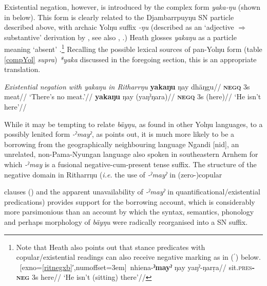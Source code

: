 {Existential negation, however, is introduced by the complex form \textit{yaka-ŋu} (shown in \nextx{} below). This form is clearly related to the Djambarrpuyŋu SN particle described above, with archaic Yolŋu suffix {\textit{-ŋu}} (described as an `adjective $\Rightarrow$ substantive' derivation by \citealt[34]{Schebeck2001}, see also \citealt[174ff]{Wilkinson1991}, \citealt[24]{Heath1980}.) Heath glosses \textit{yakaŋu} as a particle meaning `absent' \citeyearpar[102]{Heath1980}.\footnote{Note that Heath also points out that stance predicates with copular/existential readings can also receive negative marking as in ($^\prime$) below. 
	\pex~[exno=\ref{ritnegxb}′,numoffset=3em]~\begingl\gla nhiena-\textbf{ˀmayˀ} ŋay yaŋˀ-ŋarṛa//
	\glb sit\textsc{.pres\textbf{-neg}} 3\gls{s} here//
	\glft`He isn't (sitting) there'//\endgl \xe
}
Recalling the possible lexical sources of pan-Yolŋu form (table \ref{compYol} \textit{supra}) \textit{*yaka} discussed in the foregoing section, this is an appropriate translation.

\pex\textit{ Existential negation with {\em yakaŋu} in Ritharrŋu}
\a\begingl\gla \textbf{yakaŋu} ŋay dhäŋgu//
\glb\textsc{\textbf{negq}} 3\gls{s} meat//
\glft`There's no meat.'//
\endgl
\a\label{ritnegxb}\begingl\gla \textbf{yakaŋu} ŋay (yaŋˀŋara)//
\glb \textsc{\textbf{negq}} 3\gls{s} (here)//
\glft`He isn't here'//\endgl
\xe

While it may be tempting to relate \textit{bäyŋu}, as found in other Yolŋu languages, to a possibly lenited form \textit{-ˀmayˀ}, as \citet[102]{Heath1980} points out, it is much more likely to be a borrowing from the geographically neighbouring language Ngandi [\gls{nid}], an unrelated, non-Pama-Nyungan language also spoken in southeastern Arnhem for which \textit{-ˀmay} is a fusional negative-cum-present tense suffix. The structure of the negative domain in Ritharrŋu (\textit{i.e.} the use of \textit{‑ˀmayˀ} in (zero-)copular} clauses () and the apparent unavailability of \textit{‑ˀmayˀ} in quantificational/existential predications) provides support for the borrowing account, which is considerably more parsimonious than an account by which the syntax, semantics, phonology and perhaps morphology  of \textit{bäyŋu} were radically reorganised into a SN suffix.
